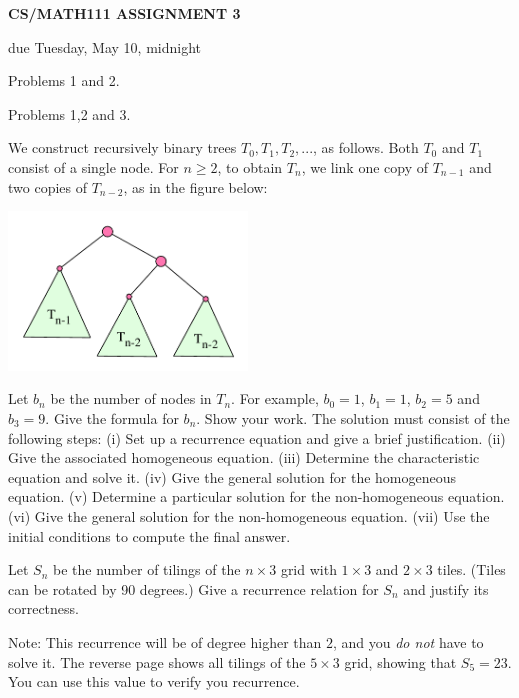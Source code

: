 \documentclass{article}
\begin{document}
\centerline{\large \bf CS/MATH111 ASSIGNMENT 3}
\centerline{due Tuesday, May 10, midnight}

\vskip 0.2in
 Problems 1 and 2.

 Problems 1,2 and 3.

\vskip 0.1in


\begin{problem}
We construct recursively binary trees $T_0, T_1, T_2, ...$,
as follows. Both $T_0$ and $T_1$ consist of a single node.
For $n\ge 2$, to obtain $T_n$, we link
one copy of $T_{n-1}$ and two copies of
$T_{n-2}$, as in the figure below:

\begin{center}
\includegraphics[width=2.5in]{hw3_bin_tree.pdf}
\end{center}

Let $b_n$ be the number of nodes in $T_n$. For example,
$b_0 = 1$, $b_1 = 1$, $b_2 = 5$ and $b_3 = 9$. Give the
formula for $b_n$. Show your work.  The solution
must consist of the following steps:
(i) Set up a recurrence equation and give a brief justification.
(ii) Give the associated homogeneous equation.
(iii) Determine the characteristic equation and solve it.
(iv) Give the general solution for the homogeneous equation.
(v) Determine a particular solution for the non-homogeneous equation.
(vi) Give the general solution for the non-homogeneous equation.
(vii) Use the initial conditions to compute the final answer.
\end{problem}


\begin{problem}
Let $S_n$ be the number of tilings of the $n\times 3$ grid with
$1\times 3$ and $2\times 3$ tiles. (Tiles can be rotated by 90 degrees.)
 Give a recurrence relation
for $S_n$ and justify its correctness.

Note: This recurrence will be of degree higher than $2$, and you
\emph{do not} have to solve it. The reverse page shows all tilings of
the $5\times 3$ grid, showing that $S_5 = 23$. You can use this value to
verify you recurrence.
\end{problem}
\end{document}
